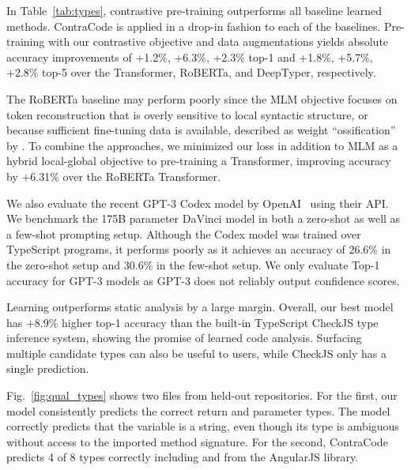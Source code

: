 \documentclass[11pt]{article}
\newcommand{\ours}[0]{ContraCode}
\begin{document}
In Table~\ref{tab:types}, contrastive pre-training outperforms all baseline learned methods.
\ours{} is applied in a drop-in fashion to each of the baselines. Pre-training with our contrastive objective and data augmentations yields absolute accuracy improvements of +1.2\%, +6.3\%, +2.3\% top-1 and +1.8\%, +5.7\%, +2.8\% top-5 over the Transformer, RoBERTa, and DeepTyper, respectively.

The RoBERTa baseline may perform poorly since the MLM objective focuses on token reconstruction that is overly sensitive to local syntactic structure, or because sufficient fine-tuning data is available, described as weight ``ossification'' by \citet{hernandez2021scaling}. To combine the approaches, we minimized our loss in addition to MLM as a hybrid local-global objective to pre-training a Transformer, improving accuracy by +6.31\% over the RoBERTa Transformer.

We also evaluate the recent GPT-3 Codex model by OpenAI~\cite{openai_codex} using their API. We benchmark the 175B parameter DaVinci model in both a zero-shot as well as a few-shot prompting setup. Although the Codex model was trained over TypeScript programs, it performs poorly as it achieves an accuracy of 26.6\% in the zero-shot setup and 30.6\% in the few-shot setup. We only evaluate Top-1 accuracy for GPT-3 models as GPT-3 does not reliably output confidence scores.

Learning outperforms static analysis by a large margin. Overall, our best model has +8.9\% higher top-1 accuracy than the built-in TypeScript CheckJS type inference system, showing the promise of learned code analysis. Surfacing multiple candidate types can also be useful to users, while CheckJS only has a single prediction.

Fig.~\ref{fig:qual_types} shows two files from held-out repositories.
For the first, our model consistently predicts the correct return and parameter types.
The model correctly predicts that the variable  is a string, even though its type is ambiguous without access to the imported  method signature. For the second, \ours{} predicts 4 of 8 types correctly including  and  from the AngularJS library. 
\end{document}
